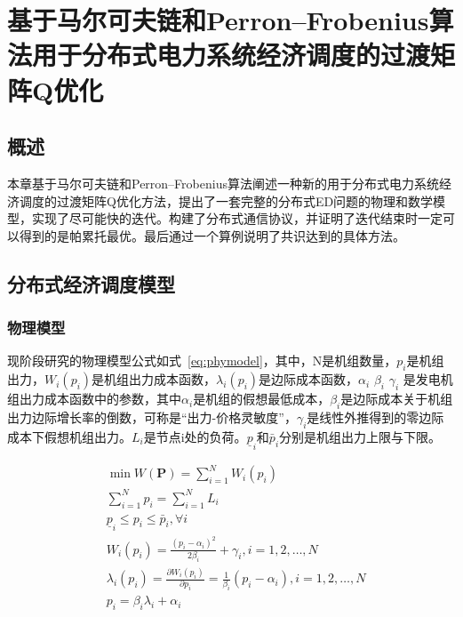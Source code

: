 \chapter{基于马尔可夫链和Perron–Frobenius算法用于分布式电力系统经济调度的过渡矩阵Q优化}
\label{cha:Algorithm}

\section{概述}

本章基于马尔可夫链和Perron–Frobenius算法阐述一种新的用于分布式电力系统经济调度的过渡矩阵Q优化方法，提出了一套完整的分布式ED问题的物理和数学模型，实现了尽可能快的迭代。构建了分布式通信协议，并证明了迭代结束时一定可以得到的是帕累托最优。最后通过一个算例说明了共识达到的具体方法。

\section{分布式经济调度模型}

\subsection{物理模型}

现阶段研究的物理模型公式如式~\ref{eq:phymodel}，其中，N是机组数量，$p_{i}$是机组出力，$W_{i}\left(p_{i}\right)$是机组出力成本函数，$\lambda_{i}\left(p_{i}\right)$是边际成本函数，$\alpha_{i}$ $\beta_{i}$ $\gamma_{i}$ 是发电机组出力成本函数中的参数，其中$\alpha_{i}$是机组的假想最低成本，$\beta_{i}$是边际成本关于机组出力边际增长率的倒数，可称是“出力-价格灵敏度”，$\gamma_{i}$是线性外推得到的零边际成本下假想机组出力。$L_{i}$是节点i处的负荷。$\underline{p}_{i}$和$\bar{p}_{i}$分别是机组出力上限与下限。

\begin{equation}
    \begin{aligned}
    &\min W(\mathbf{P})=\sum_{i=1}^{N} W_{i}\left(p_{i}\right)\\
    &\sum_{i=1}^{N} p_{i}=\sum_{i=1}^{N} L_{i}\\
    &\underline{p}_{i} \leq p_{i} \leq \bar{p}_{i}, \forall i\\
    &W_{i}\left(p_{i}\right)=\frac{\left(p_{i}-\alpha_{i}\right)^{2}}{2 \beta_{i}}+\gamma_{i}, i=1,2, \ldots, N\\
    &\lambda_{i}\left(p_{i}\right)=\frac{\partial W_{i}\left(p_{i}\right)}{\partial p_{i}}=\frac{1}{\beta_{i}}\left(p_{i}-\alpha_{i}\right), i=1,2, \ldots, N\\
    &p_{i}=\beta_{i} \lambda_{i}+\alpha_{i}
    \end{aligned}
    \label{eq:phymodel} 
\end{equation}

